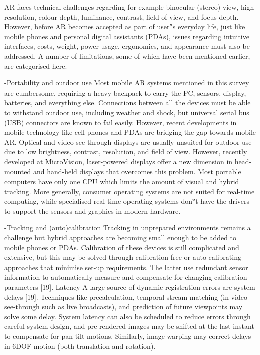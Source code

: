
AR faces technical challenges regarding for example binocular
(stereo) view, high resolution, colour depth, luminance,
contrast, field of view, and focus depth. However,
before AR becomes accepted as part of user‟s everyday life,
just like mobile phones and personal digital assistants
(PDAs), issues regarding intuitive interfaces, costs, weight,
power usage, ergonomics, and appearance must also be addressed.
A number of limitations, some of which have been
mentioned earlier, are categorised here.

-Portability and outdoor use
Most mobile AR systems mentioned in this survey are
cumbersome, requiring a heavy backpack to carry the PC,
sensors, display, batteries, and everything else. Connections
between all the devices must be able to withstand outdoor use,
including weather and shock, but universal serial bus (USB)
connectors are known to fail easily. However, recent developments
in mobile technology like cell phones and PDAs
are bridging the gap towards mobile AR.
Optical and video see-through displays are usually unsuited
for outdoor use due to low brightness, contrast, resolution,
and field of view. However, recently developed at
MicroVision, laser-powered displays offer a new dimension
in head-mounted and hand-held displays that overcomes this
problem.
Most portable computers have only one CPU which limits
the amount of visual and hybrid tracking. More generally,
consumer operating systems are not suited for real-time
computing, while specialised real-time operating systems
don‟t have the drivers to support the sensors and graphics in
modern hardware.

-Tracking and (auto)calibration
Tracking in unprepared environments remains a challenge
but hybrid approaches are becoming small enough to be added to mobile phones or PDAs. Calibration of these devices
is still complicated and extensive, but this may be
solved through calibration-free or auto-calibrating approaches
that minimise set-up requirements. The latter use
redundant sensor information to automatically measure and
compensate for changing calibration parameters [19].
Latency A large source of dynamic registration errors are
system delays [19]. Techniques like precalculation, temporal
stream matching (in video see-through such as live broadcasts),
and prediction of future viewpoints may solve some
delay. System latency can also be scheduled to reduce errors
through careful system design, and pre-rendered images may
be shifted at the last instant to compensate for pan-tilt motions.
Similarly, image warping may correct delays in 6DOF
motion (both translation and rotation).

